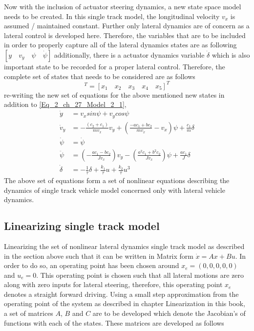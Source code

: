 Now with the inclusion of actuator steering dynamics, a new state space model needs to be created. In this single track model, the longitudinal velocity $v_x$ is assumed / maintained constant. Further only lateral dynamics are of concern as a lateral control is developed here. Therefore, the variables that are to be included in order to properly capture all of the lateral dynamics states are as following $[y \quad v_y \quad \psi \quad \dot{\psi}]$ additionally, there is a actuator dynamics variable $\dot{\delta}$ which is also important state to be recorded for a proper lateral control. Therefore, the complete set of states that needs to be considered are as follows
\begin{equation}
	[y \quad v_y \quad \psi \quad \dot{\psi} \quad \delta]^{T} = [x_1 \quad x_2 \quad x_3 \quad x_4 \quad x_5]^{T}
\end{equation}
re-writing the new set of equations for the above mentioned new states in addition to \eqref{Eq_2_ch_27_Model_2_1},
\begin{align}
	\dot{y} &= v_x sin\psi + v_y cos\psi \\
	\dot{v}_y &= -\frac{(c_2 + c_1)}{m v_x} v_y + \left(\frac{-a c_1 + b c_2}{m v_x} -v_x\right)\psi + \frac{c_1}{m} \delta \\
	\dot{\psi} &= \dot{\psi} \\
	\ddot{\psi} &= \left(-\frac{a c_1 - b c_2}{J v_x}\right)v_y - \left(\frac{a^2 c_1 + b^2 c_2}{J v_x}\right) \psi + \frac{a c_1}{J} \delta \\
	\dot{\delta} &= -\frac{1}{\tau} \delta + \frac{k_1}{\tau} u + \frac{k_2}{\tau}u^{3}
\end{align}
The above set of equations form a set of nonlinear equations describing the dynamics of single track vehicle model concerned only with lateral vehicle dynamics. 

\subsection{Linearizing single track model}
Linearizing the set of nonlinear lateral dynamics single track model as described in the section above such that it can be written in Matrix form $\dot{x} = Ax + Bu$. In order to do so, an operating point has been chosen around $x_e = (0,0,0,0,0)$ and $u_e = 0$. This operating point is chosen such that all lateral motions are zero along with zero inputs for lateral steering, therefore, this operating point $x_e$ denotes a straight forward driving. Using a small step approximation from the operating point of the system as described in chapter Linearization in this book, a set of matrices $A$, $B$ and $C$ are to be developed which denote the Jacobian's of functions with each of the states. These matrices are developed as follows

